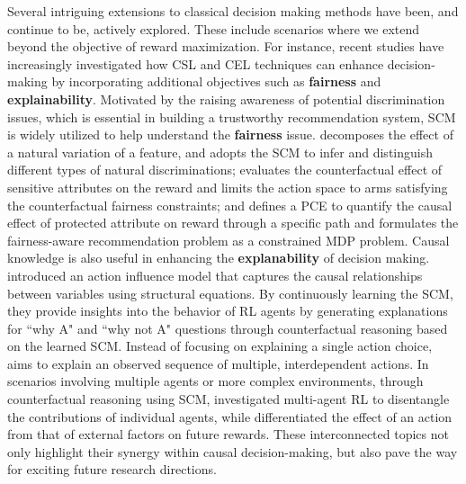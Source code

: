 Several intriguing extensions to classical decision making methods have been, and continue to be, actively explored. These include scenarios where we extend beyond the objective of reward maximization. For instance, recent studies have increasingly investigated how \acrshort{CSL} and \acrshort{CEL} techniques can enhance decision-making by incorporating additional objectives such as \textbf{fairness} and \textbf{explainability}. %
Motivated by the raising awareness of potential discrimination issues, which is essential in building a trustworthy recommendation system, \acrshort{SCM} is widely utilized to help understand the \textbf{fairness} issue. %
\citet{zhang2018fairness} decomposes the effect of a natural variation of a feature, and adopts the \acrshort{SCM} to infer and distinguish different types of natural discriminations; \citet{huang2022achieving} evaluates the counterfactual effect of sensitive attributes on the reward and limits the action space to arms satisfying the counterfactual fairness constraints; and \citet{balakrishnan2022scales} defines a \acrfull{PCE} to quantify the causal effect of protected attribute on reward through a specific path and formulates the fairness-aware recommendation problem as a constrained \acrshort{MDP} problem. Causal knowledge is also useful in enhancing the \textbf{explanability} of decision making. \citet{madumal2020explainable} introduced an action influence model that captures the causal relationships between variables using structural equations. By continuously learning the \acrshort{SCM}, they provide insights into the behavior of \acrshort{RL} agents by generating explanations for ``why A" and ``why not A" questions through counterfactual reasoning based on the learned \acrshort{SCM}. Instead of focusing on explaining a single action choice, \citet{tsirtsis2021counterfactual} aims to explain an observed sequence of multiple, interdependent actions. In scenarios involving multiple agents or more complex environments, through counterfactual reasoning using \acrshort{SCM}, \citet{triantafyllou2022actual} investigated multi-agent \acrshort{RL} to disentangle the contributions of individual agents, while \citet{mesnard2020counterfactual} differentiated the effect of an action from that of external factors on future rewards. These interconnected topics not only highlight their synergy within causal decision-making, but also pave the way for exciting future research directions.



